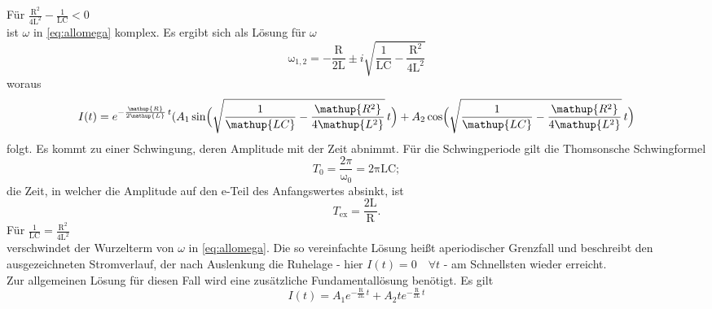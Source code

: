 Für $\frac{\mathup{R^2}}{4\mathup{L^2}}-\frac{1}{\mathup{LC}}<0$ \\
ist $\omega$ in \eqref{eq:allomega} komplex.
Es ergibt sich als Lösung für $\omega$
\begin{equation}
	\mathup{\omega_{1,2}}= -\frac{\mathup{R}}{2\mathup{L}}\pm i\sqrt{\frac{1}{\mathup{LC}}-\frac{\mathup{R^2}}{4\mathup{L^2}}}
\end{equation}
woraus
\begin{equation}
	I(t) = e^{-\frac{\mathup{R}}{2\mathup{L}}\,t}(A_1 \sin\Bigl(\sqrt{\frac{1}{\mathup{LC}}-\frac{\mathup{R^2}}{4\mathup{L^2}}}\, t\Bigr)+A_2 \cos\Bigl(\sqrt{\frac{1}{\mathup{LC}}-\frac{\mathup{R^2}}{4\mathup{L^2}}}\,t\Bigr)
	\label{eq:schwingloesung}
\end{equation}
folgt.
Es kommt zu einer Schwingung, deren Amplitude mit der Zeit abnimmt. 
Für die Schwingperiode gilt die Thomsonsche Schwingformel
\begin{equation}
	T_0 = \frac{2π}{\mathup{ω_0}} = \mathup{2π L C};
\end{equation} 
die Zeit, in welcher die Amplitude auf den e-Teil des Anfangswertes absinkt, ist
\begin{equation}
	T_\text{ex} = \frac{\text{2L}}{\text{R}}.
\end{equation}
Für $\frac{1}{\mathup{LC}}=\frac{\mathup{R^2}}{4\mathup{L^2}}$ \\
verschwindet der Wurzelterm von $\omega$ in \eqref{eq:allomega}.
Die so vereinfachte Lösung heißt aperiodischer Grenzfall und beschreibt den ausgezeichneten Stromverlauf, der nach Auslenkung die Ruhelage - hier $I(t)=0 \quad\forall t$ - am Schnellsten wieder erreicht.\\
Zur allgemeinen Lösung für diesen Fall wird eine zusätzliche Fundamentallösung benötigt.
Es gilt
\begin{equation}
	I(t) = A_1 e^{-\frac{\mathup{R}}{2\mathup{L}}\,t}+A_2 t e^{-\frac{\mathup{R}}{2\mathup{L}}\,t}
\end{equation}
